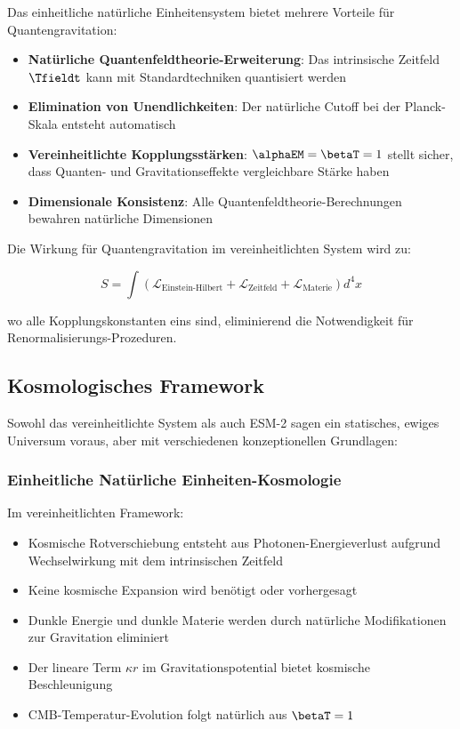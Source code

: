 	Das einheitliche natürliche Einheitensystem bietet mehrere Vorteile für Quantengravitation:
	
	\begin{itemize}
		\item \textbf{Natürliche Quantenfeldtheorie-Erweiterung}: Das intrinsische Zeitfeld $\Tfieldt$ kann mit Standardtechniken quantisiert werden
		\item \textbf{Elimination von Unendlichkeiten}: Der natürliche Cutoff bei der Planck-Skala entsteht automatisch
		\item \textbf{Vereinheitlichte Kopplungsstärken}: $\alphaEM = \betaT = 1$ stellt sicher, dass Quanten- und Gravitationseffekte vergleichbare Stärke haben
		\item \textbf{Dimensionale Konsistenz}: Alle Quantenfeldtheorie-Berechnungen bewahren natürliche Dimensionen
	\end{itemize}
	
	Die Wirkung für Quantengravitation im vereinheitlichten System wird zu:
	
	\begin{equation}
		S = \int \left( \mathcal{L}_{\text{Einstein-Hilbert}} + \mathcal{L}_{\text{Zeitfeld}} + \mathcal{L}_{\text{Materie}} \right) d^4x
	\end{equation}
	
	wo alle Kopplungskonstanten eins sind, eliminierend die Notwendigkeit für Renormalisierungs-Prozeduren.
	
	\subsection{Kosmologisches Framework}
	\label{subsec:cosmological_framework}
	
	Sowohl das vereinheitlichte System als auch ESM-2 sagen ein statisches, ewiges Universum voraus, aber mit verschiedenen konzeptionellen Grundlagen:
	
	\subsubsection{Einheitliche Natürliche Einheiten-Kosmologie}
	\label{subsubsec:unified_cosmology}
	
	Im vereinheitlichten Framework:
	\begin{itemize}
		\item Kosmische Rotverschiebung entsteht aus Photonen-Energieverlust aufgrund Wechselwirkung mit dem intrinsischen Zeitfeld
		\item Keine kosmische Expansion wird benötigt oder vorhergesagt
		\item Dunkle Energie und dunkle Materie werden durch natürliche Modifikationen zur Gravitation eliminiert
		\item Der lineare Term $\kappa r$ im Gravitationspotential bietet kosmische Beschleunigung
		\item CMB-Temperatur-Evolution folgt natürlich aus $\betaT = 1$
	\end{itemize}
	
